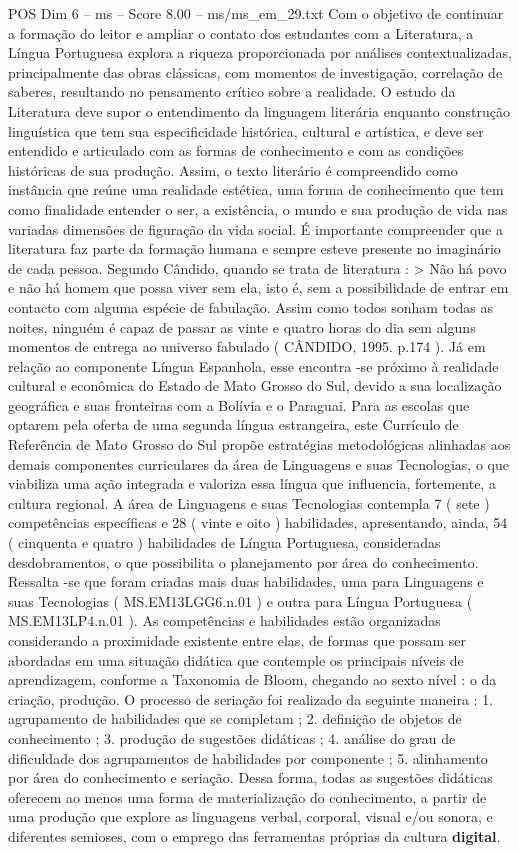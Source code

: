\begin{textsample}{POS Dim 6 – ms – Score 8.00 – ms/ms\_em\_29.txt}
Com o objetivo de continuar a formação do leitor e ampliar o contato dos estudantes com a Literatura, a Língua Portuguesa explora a riqueza proporcionada por análises contextualizadas, principalmente das obras clássicas, com momentos de investigação, correlação de saberes, resultando no pensamento crítico sobre a realidade.
O estudo da Literatura deve supor o entendimento da linguagem literária enquanto construção linguística que tem sua especificidade histórica, cultural e artística, e deve ser entendido e articulado com as formas de conhecimento e com as condições históricas de sua produção.
Assim, o texto literário é compreendido como instância que reúne uma realidade estética, uma forma de conhecimento que tem como finalidade entender o ser, a existência, o mundo e sua produção de vida nas variadas dimensões de figuração da vida social.
É importante compreender que a literatura faz parte da formação humana e sempre esteve presente no imaginário de cada pessoa.
Segundo Cândido, quando se trata de literatura : > Não há povo e não há homem que possa viver sem ela, isto é, sem a possibilidade de entrar em contacto com alguma espécie de fabulação.
Assim como todos sonham todas as noites, ninguém é capaz de passar as vinte e quatro horas do dia sem alguns momentos de entrega ao universo fabulado ( CÂNDIDO, 1995. p.174 ).
Já em relação ao componente Língua Espanhola, esse encontra -se próximo à realidade cultural e econômica do Estado de Mato Grosso do Sul, devido a sua localização geográfica e suas fronteiras com a Bolívia e o Paraguai.
Para as escolas que optarem pela oferta de uma segunda língua estrangeira, este Currículo de Referência de Mato Grosso do Sul propõe estratégias metodológicas alinhadas aos demais componentes curriculares da área de Linguagens e suas Tecnologias, o que viabiliza uma ação integrada e valoriza essa língua que influencia, fortemente, a cultura regional.
A área de Linguagens e suas Tecnologias contempla 7 ( sete ) competências específicas e 28 ( vinte e oito ) habilidades, apresentando, ainda, 54 ( cinquenta e quatro ) habilidades de Língua Portuguesa, consideradas desdobramentos, o que possibilita o planejamento por área do conhecimento.
Ressalta -se que foram criadas mais duas habilidades, uma para Linguagens e suas Tecnologias ( MS.EM13LGG6.n.01 ) e outra para Língua Portuguesa ( MS.EM13LP4.n.01 ).
As competências e habilidades estão organizadas considerando a proximidade existente entre elas, de formas que possam ser abordadas em uma situação didática que contemple os principais níveis de aprendizagem, conforme a Taxonomia de Bloom, chegando ao sexto nível : o da criação, produção.
O processo de seriação foi realizado da seguinte maneira : 1. agrupamento de habilidades que se completam ; 2. definição de objetos de conhecimento ; 3. produção de sugestões didáticas ; 4. análise do grau de dificuldade dos agrupamentos de habilidades por componente ; 5. alinhamento por área do conhecimento e seriação.
Dessa forma, todas as sugestões didáticas oferecem ao menos uma forma de materialização do conhecimento, a partir de uma produção que explore as linguagens verbal, corporal, visual e/ou sonora, e diferentes semioses, com o emprego das ferramentas próprias da cultura \textbf{digital}.


\end{textsample}
